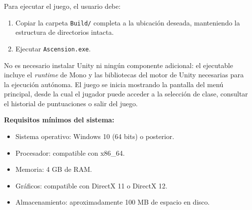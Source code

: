 Para ejecutar el juego, el usuario debe:

\begin{enumerate}
\item Copiar la carpeta \texttt{Build/} completa a la ubicación deseada, manteniendo la estructura de directorios intacta.
\item Ejecutar \texttt{Ascension.exe}.
\end{enumerate}

No es necesario instalar Unity ni ningún componente adicional: el ejecutable incluye el \textit{runtime} de Mono y las bibliotecas del motor de Unity necesarias para la ejecución autónoma. El juego se inicia mostrando la pantalla del menú principal, desde la cual el jugador puede acceder a la selección de clase, consultar el historial de puntuaciones o salir del juego.

\textbf{Requisitos mínimos del sistema:}

\begin{itemize}
\item Sistema operativo: Windows 10 (64 bits) o posterior.
\item Procesador: compatible con x86_64.
\item Memoria: 4 GB de RAM.
\item Gráficos: compatible con DirectX 11 o DirectX 12.
\item Almacenamiento: aproximadamente 100 MB de espacio en disco.
\end{itemize}

